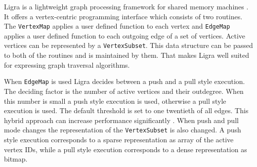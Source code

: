 
Ligra is a lightweight graph processing framework for shared memory machines \cite{Ligra}. 
It offers a vertex-centric programming interface which consists of two routines. 
The \texttt{VertexMap} applies a user defined function to each vertex and \texttt{EdgeMap} applies a user defined function to each outgoing edge of a set of vertices. 
Active vertices can be represented by a \texttt{VertexSubset}. 
This data structure can be passed to both of the routines and is maintained by them. 
That makes Ligra well suited for expressing graph traversal algorithms.

When \texttt{EdgeMap} is used Ligra decides between a push and a pull style execution.
The deciding factor is the number of active vertices and their outdegree.
When this number is small a push style execution is used, otherwise a pull style execution is used.
The default threshold is set to one twentieth of all edges.
This hybrid approach can increase performance significantly \cite{hybridBFS}.
When push and pull mode changes the representation of the \texttt{VertexSubset} is also changed. A push style execution corresponds to a sparse representation as array of the active vertex IDs, while a pull style execution corresponds to a dense representation as bitmap.
